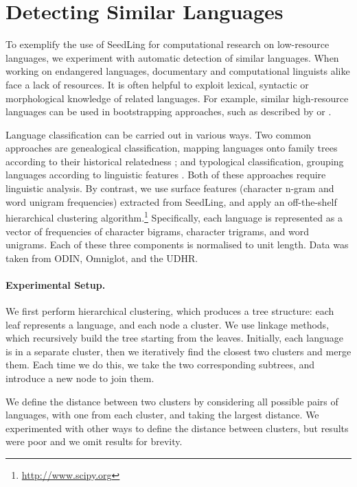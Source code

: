 \section{Detecting Similar Languages} \label{sec:cluster}

To exemplify the use of SeedLing for computational research on low-resource languages, we experiment with automatic detection of similar languages. When working on endangered languages, documentary and computational linguists alike face a lack of resources. It is often helpful to exploit lexical, syntactic or morphological knowledge of related languages. For example, similar high-resource languages can be used in bootstrapping approaches, such as described by  or .

Language classification can be carried out in various ways. Two common approaches are genealogical classification, mapping languages onto family trees according to their historical relatedness \cite{swadesh1952,starostin2010}; and typological classification, grouping languages according to linguistic features \cite{georgi2010wals,daume2009}. Both of these approaches require linguistic analysis. By contrast, we use surface features (character n-gram and word unigram frequencies) extracted from SeedLing, and apply an off-the-shelf hierarchical clustering algorithm.\footnote{\url{http://www.scipy.org}} Specifically, each language is represented as a vector of frequencies of character bigrams, character trigrams, and word unigrams. Each of these three components is normalised to unit length.  Data was taken from ODIN, Omniglot, and the UDHR.

\paragraph{Experimental Setup.}
We first perform hierarchical clustering, which produces a tree structure: each leaf represents a language, and each node a cluster. We use linkage methods, which recursively build the tree starting from the leaves. Initially, each language is in a separate cluster, then we iteratively find the closest two clusters and merge them. Each time we do this, we take the two corresponding subtrees, and introduce a new node to join them.

We define the distance between two clusters by considering all possible pairs of languages, with one from each cluster, and taking the largest distance. We experimented with other ways to define the distance between clusters, but results were poor and we omit results for brevity.

